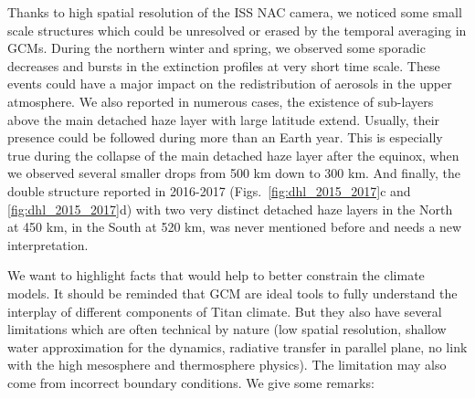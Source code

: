 Thanks to high spatial resolution of the ISS NAC camera, we noticed some small scale structures which could be unresolved or
erased by the temporal averaging in GCMs. During the northern winter and spring, we observed some sporadic decreases and
bursts in the extinction profiles at very short time scale. These events could have a major impact on the redistribution of
aerosols in the upper atmosphere. We also reported in numerous cases, the existence of sub-layers above the main detached
haze layer with large latitude extend. Usually, their presence could be followed during more than an Earth year. This is
especially true during the collapse of the main detached haze layer after the equinox, when we observed several smaller
drops from 500 km down to 300 km. And finally, the double structure reported in 2016-2017
(Figs.~\ref{fig:dhl_2015_2017}c and \ref{fig:dhl_2015_2017}d) with two very distinct detached haze layers in the
North at 450 km, in the South at 520 km, was never mentioned before and needs a new interpretation.

We want to highlight facts that would help to better constrain the climate models. It should be reminded that GCM
are ideal tools to fully understand the interplay of different components of Titan climate.
But they also have several limitations which are often technical by nature (low spatial resolution, shallow water
approximation for the dynamics, radiative transfer in parallel plane, no link with the high mesosphere and thermosphere physics).
The limitation may also come from incorrect boundary conditions. We give some remarks:

